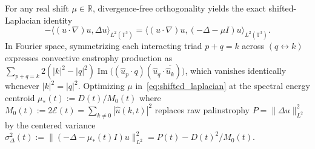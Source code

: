 \documentclass[11pt]{article}
\theoremstyle{plain}
\theoremstyle{definition}
\begin{document}
For any real shift $\mu \in \mathbb{R}$, divergence-free orthogonality yields the exact shifted-Laplacian identity
\begin{equation}\label{eq:shifted_laplacian}
  -\langle (u\cdot\nabla)u, \Delta u\rangle_{L^2(\mathbb{T}^3)} = \langle (u\cdot\nabla)u, (-\Delta - \mu I)u\rangle_{L^2(\mathbb{T}^3)}.
\end{equation}
In Fourier space, symmetrizing each interacting triad $p + q = k$ across $(q \leftrightarrow k)$ expresses convective enstrophy production as $\sum_{p+q=k} 2(|k|^2 - |q|^2)\operatorname{Im}\bigl((\hat{u}_p\cdot q)(\hat{u}_q\cdot\overline{\hat{u}_k})\bigr)$, which vanishes identically whenever $|k|^2 = |q|^2$. Optimizing $\mu$ in~\eqref{eq:shifted_laplacian} at the spectral energy centroid $\mu_*(t) := D(t)/M_0(t)$ where $M_0(t) := 2\mathcal{E}(t) = \sum_{k \neq 0} |\hat{u}(k,t)|^2$ replaces raw palinstrophy $P = \|\Delta u\|_{L^2}^2$ by the centered variance $\sigma_{\Delta}^2(t) := \|(-\Delta - \mu_*(t)I)u\|_{L^2}^2 = P(t) - D(t)^2 / M_0(t)$.
\end{document}
